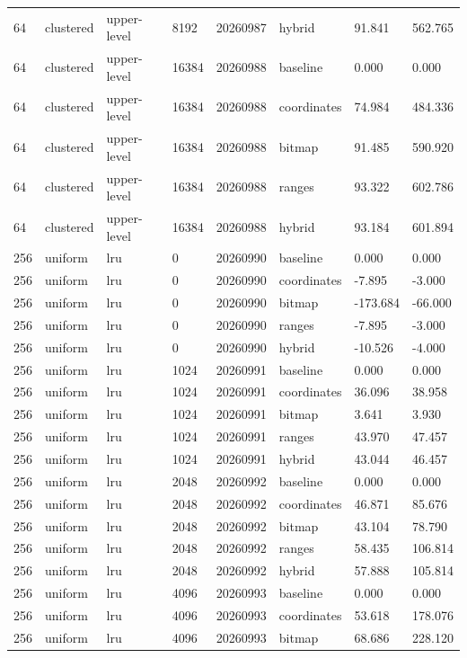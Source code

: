 \begin{tabular}{llllllll}
64 & clustered & upper-level & 8192 & 20260987 & hybrid & 91.841 & 562.765 \\
64 & clustered & upper-level & 16384 & 20260988 & baseline & 0.000 & 0.000 \\
64 & clustered & upper-level & 16384 & 20260988 & coordinates & 74.984 & 484.336 \\
64 & clustered & upper-level & 16384 & 20260988 & bitmap & 91.485 & 590.920 \\
64 & clustered & upper-level & 16384 & 20260988 & ranges & 93.322 & 602.786 \\
64 & clustered & upper-level & 16384 & 20260988 & hybrid & 93.184 & 601.894 \\
256 & uniform & lru & 0 & 20260990 & baseline & 0.000 & 0.000 \\
256 & uniform & lru & 0 & 20260990 & coordinates & -7.895 & -3.000 \\
256 & uniform & lru & 0 & 20260990 & bitmap & -173.684 & -66.000 \\
256 & uniform & lru & 0 & 20260990 & ranges & -7.895 & -3.000 \\
256 & uniform & lru & 0 & 20260990 & hybrid & -10.526 & -4.000 \\
256 & uniform & lru & 1024 & 20260991 & baseline & 0.000 & 0.000 \\
256 & uniform & lru & 1024 & 20260991 & coordinates & 36.096 & 38.958 \\
256 & uniform & lru & 1024 & 20260991 & bitmap & 3.641 & 3.930 \\
256 & uniform & lru & 1024 & 20260991 & ranges & 43.970 & 47.457 \\
256 & uniform & lru & 1024 & 20260991 & hybrid & 43.044 & 46.457 \\
256 & uniform & lru & 2048 & 20260992 & baseline & 0.000 & 0.000 \\
256 & uniform & lru & 2048 & 20260992 & coordinates & 46.871 & 85.676 \\
256 & uniform & lru & 2048 & 20260992 & bitmap & 43.104 & 78.790 \\
256 & uniform & lru & 2048 & 20260992 & ranges & 58.435 & 106.814 \\
256 & uniform & lru & 2048 & 20260992 & hybrid & 57.888 & 105.814 \\
256 & uniform & lru & 4096 & 20260993 & baseline & 0.000 & 0.000 \\
256 & uniform & lru & 4096 & 20260993 & coordinates & 53.618 & 178.076 \\
256 & uniform & lru & 4096 & 20260993 & bitmap & 68.686 & 228.120 \\

\end{tabular}
